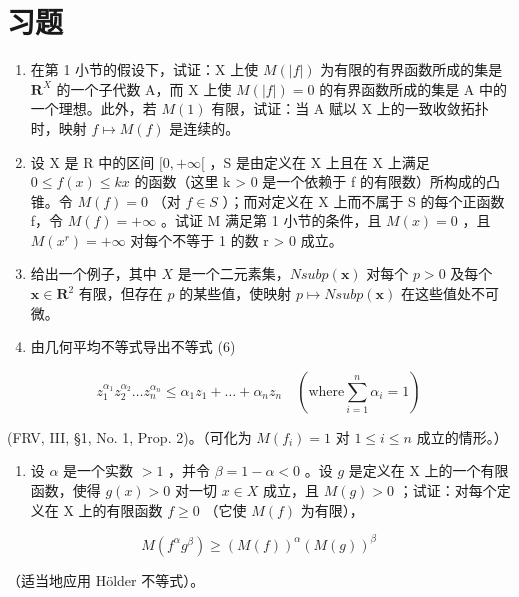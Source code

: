 \chapter*{习题}
{}

\begin{enumerate}
\def\labelenumi{\arabic{enumi})}
\item
  在第 1 小节的假设下，试证：X 上使 \(M(|f|)\) 为有限的有界函数所成的集是 \(\mathbf{R}^X\) 的一个子代数 A，而 X 上使 \(M(|f|) = 0\) 的有界函数所成的集是 A 中的一个理想。此外，若 \(M(1)\) 有限，试证：当 A 赋以 X 上的一致收敛拓扑时，映射 \(f \mapsto M(f)\) 是连续的。
\item
  设 X 是 R 中的区间 \([0, +\infty[\) ，S 是由定义在 X 上且在 X 上满足 \(0 \leqslant f(x) \leqslant kx\) 的函数（这里 k \textgreater{} 0 是一个依赖于 f 的有限数）所构成的凸锥。令 \(M(f) = 0\) （对 \(f \in S\) ）；而对定义在 X 上而不属于 S 的每个正函数 f，令 \(M(f) = +\infty\) 。试证 M 满足第 1 小节的条件，且 \(M(x) = 0\) ，且 \(M(x^{r}) = +\infty\) 对每个不等于 1 的数 r \textgreater{} 0 成立。
\item
  给出一个例子，其中 \(X\) 是一个二元素集，\(N sub p(\mathbf{x})\) 对每个 \(p > 0\) 及每个 \(\mathbf{x} \in \mathbf{R}^2\) 有限，但存在 \(p\) 的某些值，使映射 \(p \mapsto N sub p(\mathbf{x})\) 在这些值处不可微。
\item
  由几何平均不等式导出不等式 (6)
\end{enumerate}

\[
z _ {1} ^ {\alpha_ {1}} z _ {2} ^ {\alpha_ {2}} \dots z _ {n} ^ {\alpha_ {n}} \leqslant \alpha_ {1} z _ {1} + \dots + \alpha_ {n} z _ {n} \quad (\text {where} \sum_ {i = 1} ^ {n} \alpha_ {i} = 1)
\]

(FRV, III, §1, No. 1, Prop. 2)。（可化为 \(M(f_i) = 1\) 对 \(1 \leqslant i \leqslant n\) 成立的情形。）

\begin{enumerate}
\def\labelenumi{\arabic{enumi})}
\setcounter{enumi}{4}
\tightlist
\item
  设 \(\alpha\) 是一个实数 \(>1\) ，并令 \(\beta = 1 - \alpha < 0\) 。设 \(g\) 是定义在 X 上的一个有限函数，使得 \(g(x) > 0\) 对一切 \(x \in X\) 成立，且 \(M(g) > 0\) ；试证：对每个定义在 X 上的有限函数 \(f \geqslant 0\) （它使 \(M(f)\) 为有限），
\end{enumerate}

\[
M (f ^ {\alpha} g ^ {\beta}) \geqslant (M (f)) ^ {\alpha} (M (g)) ^ {\beta}
\]

（适当地应用 Hölder 不等式）。

